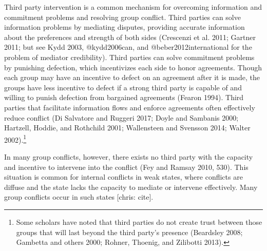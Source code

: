 \documentclass[11pt]{article}
\begin{document}
Third party intervention is a common mechanism for overcoming
information and commitment problems and resolving group conflict. Third
parties can solve information problems by mediating disputes, providing
accurate information about the preferences and strength of both sides
(Crescenzi et al. 2011; Gartner 2011; but see Kydd 2003, @kydd2006can,
and @beber2012international for the problem of mediator credibility).
Third parties can solve commitment problems by punishing defection,
which incentivizes each side to honor agreements. Though each group may
have an incentive to defect on an agreement after it is made, the groups
have less incentive to defect if a strong third party is capable of and
willing to punish defection from bargained agreements (Fearon 1994).
Third parties that facilitate information flows and enforce agreements
often effectively reduce conflict (Di Salvatore and Ruggeri 2017; Doyle
and Sambanis 2000; Hartzell, Hoddie, and Rothchild 2001; Wallensteen and
Svensson 2014; Walter 2002).\footnote{Some scholars have noted that
  third parties do not create trust between those groups that will last
  beyond the third party's presence (Beardsley 2008; Gambetta and others
  2000; Rohner, Thoenig, and Zilibotti 2013).}

In many group conflicts, however, there exists no third party with the
capacity and incentive to intervene into the conflict (Fey and Ramsay
2010, 530). This situation is common for internal conflicts in weak
states, where conflicts are diffuse and the state lacks the capacity to
mediate or intervene effectively. Many group conflicts occur in such
states {[}chris: cite{]}.
\end{document}
